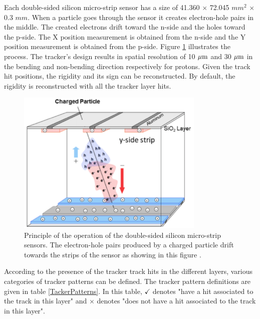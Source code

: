 Each double-sided silicon micro-strip sensor has a size of 41.360 $\times$ 72.045 $mm^2$ $\times$ 0.3 $mm$. When a particle goes through the sensor it creates electron-hole pairs in the middle. The created electrons drift toward the n-side and the holes toward the p-side. The X position measurement is obtained from the n-side and the Y position measurement is obtained from the p-side. Figure \ref{SiliconLayer} illustrates the process. The tracker's design results in spatial resolution of 10 $\rm{\mu m}$ and 30 $\rm{\mu m}$ in the bending and non-bending direction respectively for protons. Given the track hit positions, the rigidity and its sign can be reconstructed. By default, the rigidity is reconstructed with all the tracker layer hits. \par

\begin{figure}[htpb]
\centering
\includegraphics[width=0.8\textwidth, height=0.4\textheight ]{Figures/chapter3/Tracker/SiliconLayer.png}
\caption[Principle of operation of the double-sided silicon micro-strip sensors.]{Principle of the operation of the double-sided silicon micro-strip sensors. The electron-hole pairs produced by a charged particle drift towards the strips of the sensor as showing in this figure \cite{AMSWebside}.}
\label{SiliconLayer}
\end{figure}


According to the presence of the tracker track hits in the different layers, various categories of tracker patterns can be defined. The tracker pattern definitions are given in table \ref{TackerPatterns}. In this table, $\checkmark$ denotes "have a hit associated to the track in this layer" and $\times$ denotes "does not have a hit associated to the track in this layer".
 
